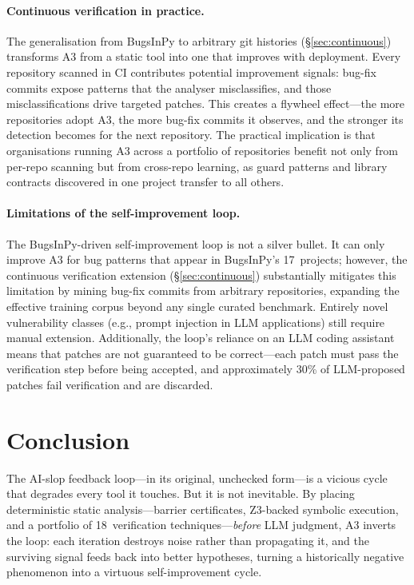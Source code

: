 \documentclass[sigconf,review,anonymous]{acmart}
\begin{document}
\paragraph{Continuous verification in practice.}
The generalisation from BugsInPy to arbitrary git histories (\S\ref{sec:continuous}) transforms \textsc{A3} from a static tool into one that improves with deployment.
Every repository scanned in CI contributes potential improvement signals: bug-fix commits expose patterns that the analyser misclassifies, and those misclassifications drive targeted patches.
This creates a flywheel effect---the more repositories adopt \textsc{A3}, the more bug-fix commits it observes, and the stronger its detection becomes for the next repository.
The practical implication is that organisations running \textsc{A3} across a portfolio of repositories benefit not only from per-repo scanning but from cross-repo learning, as guard patterns and library contracts discovered in one project transfer to all others.

\paragraph{Limitations of the self-improvement loop.}
The BugsInPy-driven self-improvement loop is not a silver bullet.  It can only improve \textsc{A3} for bug patterns that appear in BugsInPy's 17~projects; however, the continuous verification extension (\S\ref{sec:continuous}) substantially mitigates this limitation by mining bug-fix commits from arbitrary repositories, expanding the effective training corpus beyond any single curated benchmark.  Entirely novel vulnerability classes (e.g., prompt injection in LLM applications) still require manual extension.  Additionally, the loop's reliance on an LLM coding assistant means that patches are not guaranteed to be correct---each patch must pass the verification step before being accepted, and approximately 30\% of LLM-proposed patches fail verification and are discarded.

\section{Conclusion}\label{sec:conclusion}

The AI-slop feedback loop---in its original, unchecked form---is a vicious cycle that degrades every tool it touches.
But it is not inevitable.
By placing deterministic static analysis---barrier certificates, Z3-backed symbolic execution, and a portfolio of 18~verification techniques---\emph{before} LLM judgment, \textsc{A3} inverts the loop: each iteration destroys noise rather than propagating it, and the surviving signal feeds back into better hypotheses, turning a historically negative phenomenon into a virtuous self-improvement cycle.
\end{document}
